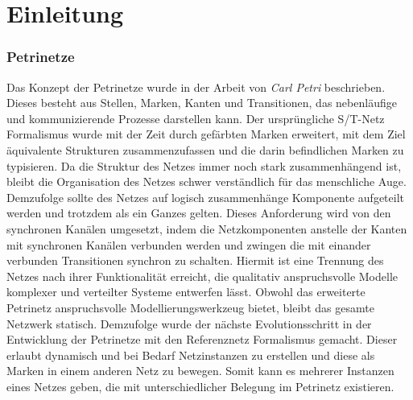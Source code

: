 \chapter{Einleitung}

\subsection{Petrinetze} %
Das Konzept der Petrinetze wurde in der Arbeit von \textit{Carl Petri} beschrieben. 
Dieses besteht aus Stellen, Marken, Kanten und Transitionen, das nebenläufige und kommunizierende Prozesse darstellen kann.
Der ursprüngliche S/T-Netz Formalismus wurde mit der Zeit durch gefärbten Marken erweitert, mit dem Ziel äquivalente Strukturen zusammenzufassen und die darin befindlichen Marken zu typisieren.
Da die Struktur des Netzes immer noch stark zusammenhängend ist, bleibt die Organisation des Netzes schwer verständlich für das menschliche Auge. \newline 
Demzufolge sollte des Netzes auf logisch zusammenhänge Komponente aufgeteilt werden und trotzdem als ein Ganzes gelten.
Dieses Anforderung wird von den synchronen Kanälen umgesetzt, indem die Netzkomponenten anstelle der Kanten mit synchronen Kanälen verbunden werden und zwingen die mit einander verbunden Transitionen synchron zu schalten.
Hiermit ist eine Trennung des Netzes nach ihrer Funktionalität erreicht, die qualitativ anspruchsvolle Modelle komplexer und verteilter Systeme entwerfen lässt.\bigbreak
Obwohl das erweiterte Petrinetz anspruchsvolle Modellierungswerkzeug bietet, bleibt das gesamte Netzwerk statisch.
Demzufolge wurde der nächste Evolutionsschritt in der Entwicklung der Petrinetze mit den Referenznetz Formalismus gemacht. 
Dieser erlaubt dynamisch und bei Bedarf Netzinstanzen zu erstellen und diese als Marken in einem anderen Netz zu bewegen. 
Somit kann es mehrerer Instanzen eines Netzes geben, die mit unterschiedlicher Belegung im Petrinetz existieren. 

